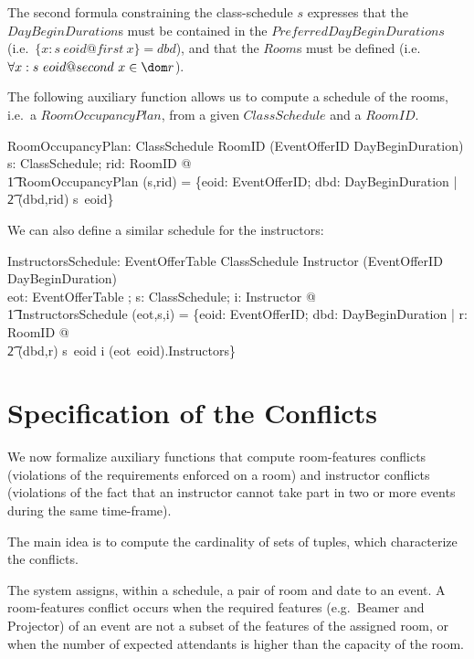 \documentclass[a4paper]{article}
\begin{document}
\noindent
The second formula constraining the class-schedule $s$ expresses that the
$DayBeginDuration$s must be contained in the $PreferredDayBeginDurations$
(i.e.~$\{x : s~eoid @ first~x\} = dbd$), and that the $Room$s must be defined
(i.e.~$\forall x : s~eoid @ second~x \in \dom r$).

The following auxiliary function allows us to compute a schedule of the rooms,
i.e.~a $RoomOccupancyPlan$, from a given $ClassSchedule$ and a $RoomID$.
\begin{axdef}
  RoomOccupancyPlan: ClassSchedule \cross RoomID \fun \power (EventOfferID
  \cross DayBeginDuration) \\
  \where
  \forall s: ClassSchedule; rid: RoomID @ \\
  \t1 RoomOccupancyPlan (s,rid) = \{eoid: EventOfferID; dbd: DayBeginDuration |
  \\ 
  \t2 (dbd,rid) \in s~eoid\}
\end{axdef}

\noindent
We can also define a similar schedule for the instructors:
\begin{axdef}
  InstructorsSchedule: EventOfferTable \cross ClassSchedule \cross Instructor
  \fun \power (EventOfferID \cross DayBeginDuration) \\ 
  \where
  \forall eot: EventOfferTable ; s: ClassSchedule; i: Instructor @ \\
  \t1 InstructorsSchedule (eot,s,i) = \{eoid: EventOfferID; dbd:
  DayBeginDuration |  \exists r: RoomID @ \\ 
  \t2 (dbd,r) \in s~eoid \land i \in (eot~eoid).Instructors\}
\end{axdef}


\section{Specification of the Conflicts} 

\vspace{1ex}\noindent
We now formalize auxiliary functions that compute room-features conflicts
(violations of the requirements enforced on a room) and instructor conflicts
(violations of the fact that an instructor cannot take part in two or more
events during the same time-frame).

The main idea is to compute the cardinality of sets of tuples, which
characterize the conflicts.

The system assigns, within a schedule, a pair of room and date to an event.  A
room-features conflict occurs when the required features (e.g.~Beamer and
Projector) of an event are not a subset of the features of the assigned room, or
when the number of expected attendants is higher than the capacity of the room.
\end{document}
